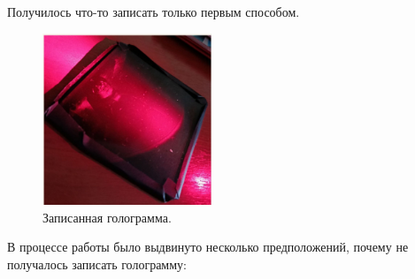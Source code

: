 \documentclass[aps,twocolumn,secnumarabic,balancelastpage,amsmath,amssymb,nofootinbib, floatfix]{revtex4-1}
\begin{document}
Получилось что-то записать только первым способом.
\begin{figure}[H]
	\centering
	\includegraphics[width=0.45\textwidth]{images/real_hol.jpeg}
	\caption{Записанная голограмма.}
	\label{fig:result_hol}
\end{figure}
\par В процессе работы было выдвинуто несколько предположений, почему не получалось записать голограмму:
\end{document}
